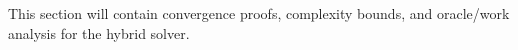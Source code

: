 This section will contain convergence proofs, complexity bounds, and oracle/work analysis for the hybrid solver.
